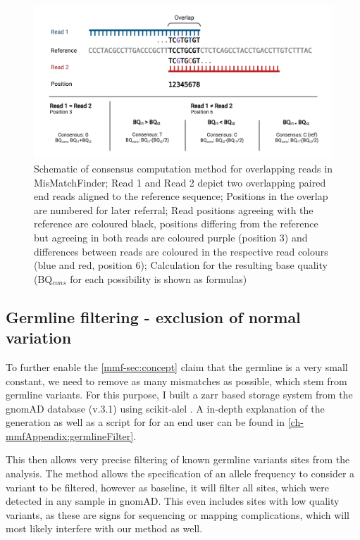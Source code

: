 \begin{figure}[!ht]
\centering
\includegraphics[width=.99\linewidth]{Figures/ConsensusMethodMisMatchFinder.pdf}
\caption[Schematic of consensus computation method for overlapping reads]{Schematic of consensus computation method for overlapping reads in MisMatchFinder; Read 1 and Read 2 depict two overlapping paired end reads aligned to the reference sequence; Positions in the overlap are numbered for later referral; Read positions agreeing with the reference are coloured black, positions differing from the reference but agreeing in both reads are coloured purple (position 3) and differences between reads are coloured in the respective read colours (blue and red, position 6); Calculation for the resulting base quality (BQ$_{cons}$ for each possibility is shown as formulas)}\label{fig:mmf-consensus}
\end{figure}

\subsection[Germline filtering]{Germline filtering - exclusion of normal variation}
\label{mmf-sec:germline}

To further enable the \autoref{mmf-sec:concept} claim that the germline is a very small constant, we need to remove as many mismatches as possible, which stem from germline variants. For this purpose, I built a zarr \cite{Miles2021} based storage system from the gnomAD database (v.3.1) \cite{Karczewski2020} using scikit-alel \cite{Miles2021a}.
A in-depth explanation of the generation as well as a script for for an end user can be found in \autoref{ch-mmfAppendix:germlineFilter}.

This then allows very precise filtering of known germline variants sites from the analysis. The method allows the specification of an allele frequency to consider a variant to be filtered, however as baseline, it will filter all sites, which were detected in any sample in gnomAD. This even includes sites with low quality variants, as these are signs for sequencing or mapping complications, which will most likely interfere with our method as well.


